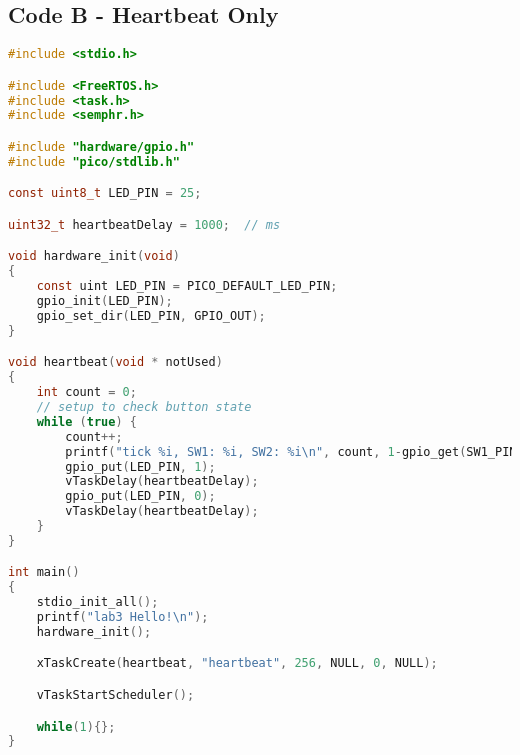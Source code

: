 \documentclass[sigconf]{article}
\begin{document}
\subsection*{Code B - Heartbeat Only}

\begin{lstlisting}[basicstyle=\footnotesize\ttfamily, language=c,breaklines]
#include <stdio.h>

#include <FreeRTOS.h>
#include <task.h>
#include <semphr.h>

#include "hardware/gpio.h"
#include "pico/stdlib.h"

const uint8_t LED_PIN = 25;

uint32_t heartbeatDelay = 1000;  // ms

void hardware_init(void)
{
    const uint LED_PIN = PICO_DEFAULT_LED_PIN;
    gpio_init(LED_PIN);
    gpio_set_dir(LED_PIN, GPIO_OUT);
}

void heartbeat(void * notUsed)
{   
    int count = 0;
    // setup to check button state
    while (true) {
        count++;
        printf("tick %i, SW1: %i, SW2: %i\n", count, 1-gpio_get(SW1_PIN), 1-gpio_get(SW2_PIN));
        gpio_put(LED_PIN, 1);
        vTaskDelay(heartbeatDelay);
        gpio_put(LED_PIN, 0);
        vTaskDelay(heartbeatDelay);
    }
}

int main()
{
    stdio_init_all();
    printf("lab3 Hello!\n");
    hardware_init();

    xTaskCreate(heartbeat, "heartbeat", 256, NULL, 0, NULL);

    vTaskStartScheduler();

    while(1){};
}

\end{lstlisting}



\end{document}
